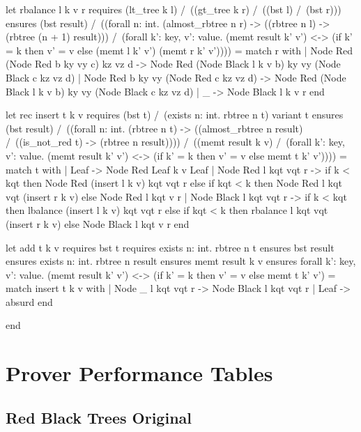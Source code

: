 \begin{whylang}
  let rbalance l k v r
  requires { (lt_tree k l) /\ ((gt_tree k r) /\ ((bst l) /\ (bst r))) }
  ensures { (bst result) /\ 
  ((forall n: int. (almost_rbtree n r) -> ((rbtree n l) -> (rbtree (n + 1) result))) /\ 
  (forall k': key, v': value. (memt result k' v') <-> (if k' = k then v' = v else (memt l k' v') \/ 
  (memt r k' v')))) } 
 = match r with
  | Node Red (Node Red b ky vy c) kz vz d -> 
    Node Red (Node Black l k v b) ky vy (Node Black c kz vz d)
  | Node Red b ky vy (Node Red c kz vz d) -> 
    Node Red (Node Black l k v b) ky vy (Node Black c kz vz d)
  | _ -> Node Black l k v r
  end

  let rec insert t k v
  requires { (bst t) /\ (exists n: int. rbtree n t) }
  variant { t }
  ensures { (bst result) /\ 
  ((forall n: int. (rbtree n t) -> ((almost_rbtree n result) /\ 
  ((is_not_red t) -> (rbtree n result)))) /\ 
  ((memt result k v) /\ 
  (forall k': key, v': value. (memt result k' v') <-> (if k' = k then v' = v else memt t k' v')))) } 
 = match t with
  | Leaf -> Node Red Leaf k v Leaf
  | Node Red l kqt vqt r -> 
    if k < kqt then Node Red (insert l k v) kqt vqt r 
    else if kqt < k then Node Red l kqt vqt (insert r k v) 
    else Node Red l kqt v r
  | Node Black l kqt vqt r -> 
    if k < kqt then lbalance (insert l k v) kqt vqt r 
    else if kqt < k then rbalance l kqt vqt (insert r k v) 
    else Node Black l kqt v r
  end

  

  let add t k v
  requires { bst t }
  requires { exists n: int. rbtree n t }
  ensures { bst result }
  ensures { exists n: int. rbtree n result }
  ensures { memt result k v }
  ensures { forall k': key, v': value. 
  (memt result k' v') <-> (if k' = k then v' = v else memt t k' v') } 
 = match insert t k v with
  | Node _ l kqt vqt r -> Node Black l kqt vqt r
  | Leaf -> absurd
  end

end
\end{whylang}

\newcommand{\explanation}[1]{\cellcolor{green!20}#1}
\newcommand{\noresult}{\cellcolor{gray!20}---}
\newcommand{\blank}{\cellcolor{gray!20}}
\newcommand{\valid}[1]{\cellcolor{green!20}#1}

\section{Prover Performance Tables}
\label{sec:Prover_Performance_Tables}

\subsection{Red Black Trees Original \whyml}
\label{subsec:Red_Black_Trees_Original_Whyml}

